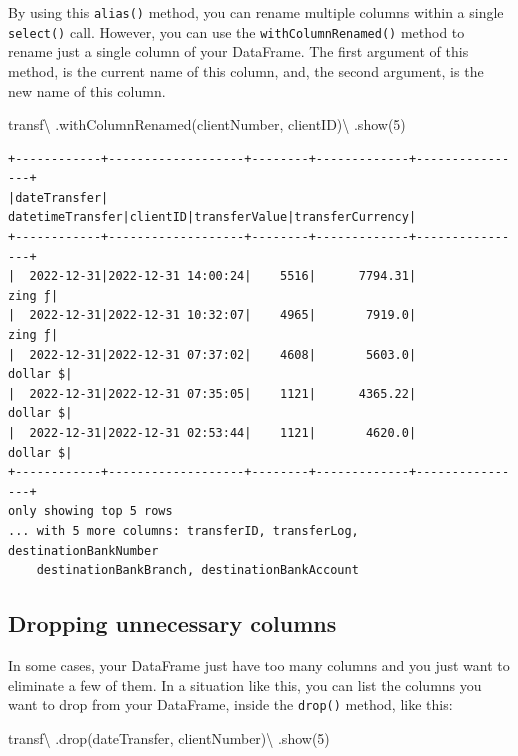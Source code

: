 \documentclass[
  11pt,
  letterpaper,
  DIV=11,
  numbers=noendperiod]{scrreprt}
\newenvironment{Shaded}{\begin{snugshade}}{\end{snugshade}}
\newcommand{\DecValTok}[1]{\textcolor[rgb]{0.68,0.00,0.00}{#1}}
\newcommand{\NormalTok}[1]{\textcolor[rgb]{0.00,0.23,0.31}{#1}}
\newcommand{\OperatorTok}[1]{\textcolor[rgb]{0.37,0.37,0.37}{#1}}
\newcommand{\StringTok}[1]{\textcolor[rgb]{0.13,0.47,0.30}{#1}}
\begin{document}
By using this \texttt{alias()} method, you can rename multiple columns
within a single \texttt{select()} call. However, you can use the
\texttt{withColumnRenamed()} method to rename just a single column of
your DataFrame. The first argument of this method, is the current name
of this column, and, the second argument, is the new name of this
column.

\begin{Shaded}
\begin{Highlighting}[]
\NormalTok{transf}\OperatorTok{\textbackslash{}}
\NormalTok{  .withColumnRenamed(}\StringTok{\textquotesingle{}clientNumber\textquotesingle{}}\NormalTok{, }\StringTok{\textquotesingle{}clientID\textquotesingle{}}\NormalTok{)}\OperatorTok{\textbackslash{}}
\NormalTok{  .show(}\DecValTok{5}\NormalTok{)}
\end{Highlighting}
\end{Shaded}

\begin{verbatim}
+------------+-------------------+--------+-------------+----------------+
|dateTransfer|   datetimeTransfer|clientID|transferValue|transferCurrency|
+------------+-------------------+--------+-------------+----------------+
|  2022-12-31|2022-12-31 14:00:24|    5516|      7794.31|          zing ƒ|
|  2022-12-31|2022-12-31 10:32:07|    4965|       7919.0|          zing ƒ|
|  2022-12-31|2022-12-31 07:37:02|    4608|       5603.0|        dollar $|
|  2022-12-31|2022-12-31 07:35:05|    1121|      4365.22|        dollar $|
|  2022-12-31|2022-12-31 02:53:44|    1121|       4620.0|        dollar $|
+------------+-------------------+--------+-------------+----------------+
only showing top 5 rows
... with 5 more columns: transferID, transferLog, destinationBankNumber
    destinationBankBranch, destinationBankAccount
\end{verbatim}

\hypertarget{dropping-unnecessary-columns}{%
\subsection{Dropping unnecessary
columns}\label{dropping-unnecessary-columns}}

In some cases, your DataFrame just have too many columns and you just
want to eliminate a few of them. In a situation like this, you can list
the columns you want to drop from your DataFrame, inside the
\texttt{drop()} method, like this:

\begin{Shaded}
\begin{Highlighting}[]
\NormalTok{transf}\OperatorTok{\textbackslash{}}
\NormalTok{  .drop(}\StringTok{\textquotesingle{}dateTransfer\textquotesingle{}}\NormalTok{, }\StringTok{\textquotesingle{}clientNumber\textquotesingle{}}\NormalTok{)}\OperatorTok{\textbackslash{}}
\NormalTok{  .show(}\DecValTok{5}\NormalTok{)}
\end{Highlighting}
\end{Shaded}
\end{document}
